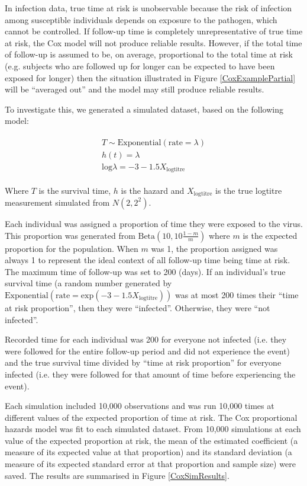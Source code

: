 \documentclass[12pt]{article}
\begin{document}
\pagebreak

In infection data, true time at risk is unobservable because the risk of infection among susceptible individuals depends on exposure to the pathogen, which cannot be controlled. If follow-up time is completely unrepresentative of true time at risk, the Cox model will not produce reliable results. However, if the total time of follow-up is assumed to be, on average, proportional to the total time at risk (e.g. subjects who are followed up for longer can be expected to have been exposed for longer) then the situation illustrated in Figure  \ref{CoxExamplePartial} will be ``averaged out'' and the model may still produce reliable results.

To investigate this, we generated a simulated dataset, based on the following model:

\begin{align*}
\begin{gathered}
T \sim \text{Exponential}(\text{rate} = \lambda) \\
h(t) = \lambda \\
\text{log}\lambda = -3 - 1.5 X_{\text{logtitre}}
\end{gathered}
\end{align*}

Where $T$ is the survival time, $h$ is the hazard and $X_{\text{logtitre}}$ is the true logtitre measurement simulated from $N(2, 2^2)$.

Each individual was assigned a proportion of time they were exposed to the virus. This proportion was generated from $\text{Beta}(10, 10\frac{1-m}{m})$ where $m$ is the expected proportion for the population. When $m$ was 1, the proportion assigned was always 1 to represent the ideal context of all follow-up time being time at risk. The maximum time of follow-up was set to 200 (days). If an individual's true survival time (a random number generated by $\text{Exponential}(\text{rate} = \text{exp}(-3 - 1.5 X_{\text{logtitre}}) )$ was at most 200 times their ``time at risk proportion'', then they were ``infected''. Otherwise, they were ``not infected''. 

Recorded time for each individual was 200 for everyone not infected (i.e. they were followed for the entire follow-up period and did not experience the event) and the true survival time divided by ``time at risk proportion'' for everyone infected (i.e. they were followed for that amount of time before experiencing the event).

Each simulation included 10,000 observations and was run 10,000 times at different values of the expected proportion of time at risk. The Cox proportional hazards model was fit to each simulated dataset. From 10,000 simulations at each value of the expected proportion at risk, the mean of the estimated coefficient (a measure of its expected value at that proportion) and its standard deviation (a measure of its expected standard error at that proportion and sample size) were saved. The results are summarised in Figure \ref{CoxSimResults}.
\end{document}
